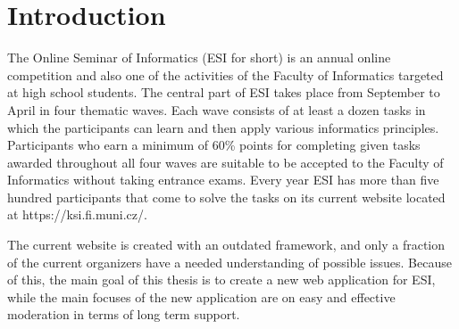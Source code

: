 \documentclass[
  digital, %
  oneside, %
  lof,     %
  lot,     %
]{fithesis4}
\begin{document}
\clearpage
\printnoidxglossary[title={Abbreviations}, type=\acronymtype]
\printnoidxglossary[title={Glossary}]

\chapter*{Introduction}

\mdstart

The Online Seminar of Informatics (ESI for short) is an annual online competition and also one of the activities of the Faculty of Informatics targeted at high school students. The central part of ESI takes place from September to April in four thematic waves. Each wave consists of at least a dozen tasks in which the participants can learn and then apply various informatics principles. Participants who earn a minimum of 60\% points for completing given tasks awarded throughout all four waves are suitable to be accepted to the Faculty of Informatics without taking entrance exams. Every year ESI has more than five hundred participants that come to solve the tasks on its current website located at https://ksi.fi.muni.cz/.

The current website is created with an outdated framework, and only a fraction of the current organizers have a needed understanding of possible issues. Because of this, the main goal of this thesis is to create a new web application for ESI, while the main focuses of the new application are on easy and effective moderation in terms of long term support.
\end{document}
